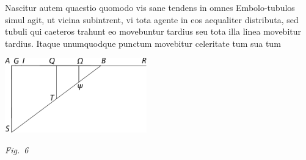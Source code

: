 \pend%
%
%
%
%
%
\pstart%
Nascitur
autem quaestio\protect{}
quomodo vis\protect{}
sane tendens in omnes Embolo-tubulos%
\protect{} simul agit,
ut vicina subintrent,
vi tota agente\protect{}
in eos aequaliter distributa,
sed tubuli\protect{}
qui caeteros trahunt
eo movebuntur tardius
seu tota illa linea movebitur tardius.
Itaque unumquodque punctum movebitur celeritate%
\protect{}
tum sua tum 
\pend
\newpage
  \centerline{\includegraphics[width=0.46\textwidth]{gesamttex/edit_VIII,3/images/LH_35_09_15_002-005_d6.pdf}}%
  \vspace{0.5em}
  \centerline{\lbrack\textit{Fig.~6}\rbrack}%
  \label{LH_35_09_15_005r_fig}

